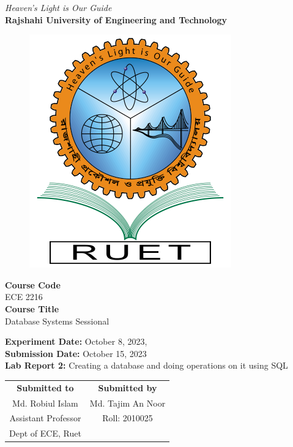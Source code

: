 \vspace*{\fill}
\begin{center}

    \emph{Heaven's Light is Our Guide} \\
    \textbf{Rajshahi University of Engineering and Technology} \\

    \begin{figure}[h]
        \centering
        \includegraphics[scale=.34]{images/RUET_logo.png}
        \label{fig:ruet_logo}
    \end{figure}
    \vspace{5mm}

    \textbf{Course Code}\\
    ECE 2216\\
    \vspace{3mm}
    \textbf{Course Title}\\
    Database Systems Sessional

    \vspace{5mm}
    \textbf{Experiment Date:} October 8, 2023,\\
    \textbf{Submission Date:} {October 15, 2023}\\

    \vspace{5mm}
    \textbf{Lab Report 2:} Creating a database and doing operations on it using SQL\\

    \vspace{15mm}

    \begin{tabular}{c|c}
        \textbf{Submitted to} & \textbf{Submitted by} \\
        Md. Robiul Islam      & Md. Tajim An Noor     \\
        Assistant Professor   & Roll: 2010025         \\
        Dept of ECE, Ruet     &                       \\
    \end{tabular}

\end{center}
\vspace*{\fill}
